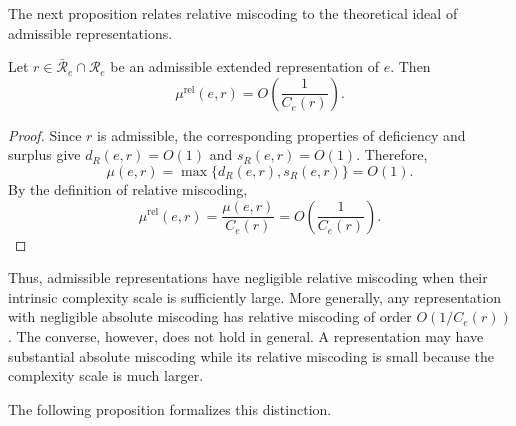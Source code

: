 The next proposition relates relative miscoding to the theoretical ideal of admissible representations.

\begin{proposition}
\label{prop:perfect_rel_miscoding}
Let $r\in\bar{\mathcal R}_e\cap\mathcal R_e$ be an admissible extended representation of $e$. Then
\[
\mu^{\mathrm{rel}}(e,r) = O\left(\frac{1}{C_e(r)}\right).
\]
\end{proposition}
\begin{proof}
Since $r$ is admissible, the corresponding properties of deficiency and surplus give $d_R(e,r)=O(1)$ and $s_R(e,r)=O(1)$. Therefore,
\[
\mu(e,r) = \max\{d_R(e,r),s_R(e,r)\} = O(1).
\]
By the definition of relative miscoding,
\[
\mu^{\mathrm{rel}}(e,r) = \frac{\mu(e,r)}{C_e(r)} = O\left(\frac{1}{C_e(r)}\right).
\]
\end{proof}

Thus, admissible representations have negligible relative miscoding when their intrinsic complexity scale is sufficiently large. More generally, any representation with negligible absolute miscoding has relative miscoding of order $O(1/C_e(r))$. The converse, however, does not hold in general. A representation may have substantial absolute miscoding while its relative miscoding is small because the complexity scale is much larger.

The following proposition formalizes this distinction.

